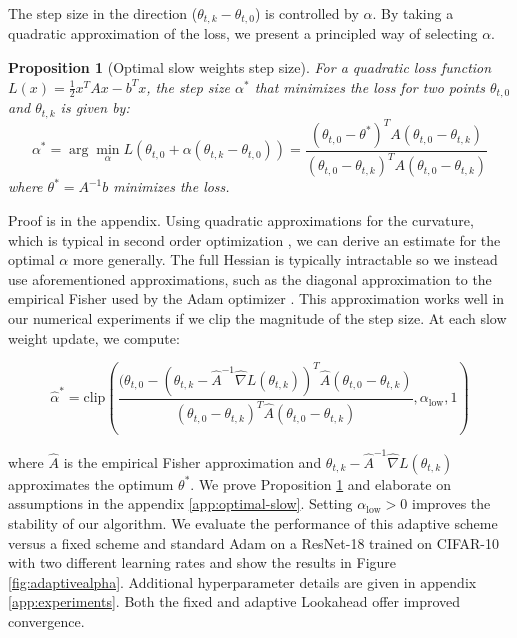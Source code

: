 \documentclass{article}
\newtheorem{proposition}{Proposition}
\begin{document}
The step size in the direction ($\theta_{t,k} - \theta_{t,0}$) is controlled by $\alpha$. By taking a quadratic approximation of the loss, we present a principled way of selecting $\alpha$. 

\begin{proposition}[Optimal slow weights step size]
\label{prop:optimal-step-size}
For a quadratic loss function $L(x) = \frac{1}{2} x^T A x - b^T x$, 
the step size $\alpha^*$ that minimizes the loss for two points $\theta_{t,0}$ and $\theta_{t,k}$ is given by:
\[ \alpha^* = \arg \min_{\alpha} L(\theta_{t,0} + \alpha (\theta_{t,k} - \theta_{t,0})) = \frac{(\theta_{t,0} - \theta^*)^T A(\theta_{t,0} - \theta_{t, k})}{(\theta_{t,0}  - \theta_{t,k})^T A (\theta_{t,0} - \theta_{t,k})}  \]
where $\theta^* = A^{-1}b$ minimizes the loss.
\end{proposition}
Proof is in the appendix. Using quadratic approximations for the curvature, which is typical in second order optimization \citep{duchi2011adaptive, kingma2014adam, martens2015optimizing}, we can derive an estimate for the optimal $\alpha$ more generally. The full Hessian is typically intractable so we instead use aforementioned approximations, such as the diagonal approximation to the empirical Fisher used by the Adam optimizer \citep{kingma2014adam}. This approximation works well in our numerical experiments if we clip the magnitude of the step size. At each slow weight update, we compute:


\[ \hat{\alpha}^* = \text{clip}( \frac{(\theta_{t,0} - (\theta_{t,k}  - \hat{A}^{-1} \hat{\nabla} L(\theta_{t,k}) )^T \hat{A} (\theta_{t,0}  - \theta_{t,k})}{(\theta_{t,0}  - \theta_{t,k})^T \hat{A} (\theta_{t,0} - \theta_{t,k})},  \alpha_{\text{low}}, 1)\]



 where $\hat{A}$ is the empirical Fisher approximation and $\theta_{t,k}  - \hat{A}^{-1} \hat{\nabla} L(\theta_{t,k})$ approximates the optimum $\theta^*$. We prove Proposition \ref{prop:optimal-step-size} and elaborate on assumptions in the appendix \ref{app:optimal-slow}. Setting $\alpha_{\text{low}} > 0$ improves the stability of our algorithm. We evaluate the performance of this adaptive scheme versus a fixed scheme and standard Adam on a ResNet-18 trained on CIFAR-10 with two different learning rates and show the results in Figure \ref{fig:adaptivealpha}. Additional hyperparameter details are given in appendix \ref{app:experiments}. Both the fixed and adaptive Lookahead offer improved convergence.
\end{document}
